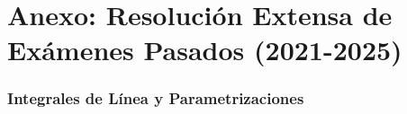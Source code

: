 \documentclass[11pt,a4paper]{article}
\begin{document}
\newpage
\part*{Anexo: Resolución Extensa de Exámenes Pasados (2021-2025)}

\begin{abstract}
Para consolidar definitivamente el marco teórico expuesto y dotar al estudiante de las herramientas necesarias para enfrentar las evaluaciones más exigentes de la Escuela Profesional de Matemática de la UNI, este anexo contiene una selección curada de más de 12 problemas de Prácticas Calificadas (PC) y Exámenes Finales (EF) recientes. Cada ejercicio se aborda con el máximo nivel de rigor, sin omitir pasos algebraicos, justificando topológicamente las condiciones de aplicabilidad de los teoremas, y presentando un análisis exhaustivo del planteamiento y su desarrollo metodológico.
\end{abstract}

\section{Integrales de Línea y Parametrizaciones}
\end{document}

